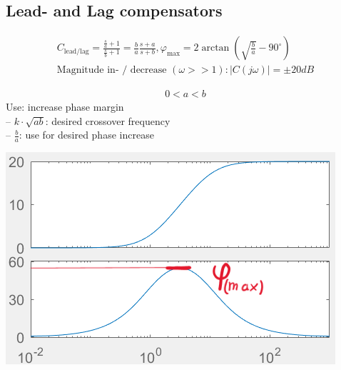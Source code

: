 \subsection{Lead- and Lag compensators}
    \begin{align*}
        C_{\text{lead/lag}} = \frac{\frac{s}{a} + 1}{\frac{s}{b} + 1} = \frac{b}{a} \frac{s+a}{s+b}, \varphi_{\text{max}} = 2 \arctan\left(\sqrt{\frac{b}{a}} - 90^{\circ}\right)\\
        \text{Magnitude in- / decrease } (\omega >> 1): |C(j \omega)| = \pm 20 dB
    \end{align*}
    
        \begin{minipage}{0.49\linewidth}
            \begin{align*}
                0 < a < b
            \end{align*}
            Use: increase phase margin\\
            – $k \cdot \sqrt{ab}$: desired crossover frequency\\
            – $\frac{b}{a}$: use for desired phase increase\\
        \end{minipage}
        \begin{minipage}{0.49\linewidth}
            \includegraphics[width = \linewidth]{src/images/lead-controller.png}
        \end{minipage}


